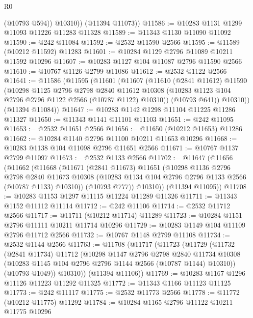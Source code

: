 \begin{lexlean}{R0}
\begin{coremodule}
            (@10793 @594))
          @10310))
      (@11394 @11073))
@11586 := @10283 @1131 @1299 @11093 @11226 @11283 @11328
@11589 := @11343 @1130 @11090 @11092
@11590 := @242 @11084
@11592 := @2532 @11590 @2566
@11595 := @11589 (@10212 @11592) @11283
@11601 := @10284 @1129 @2796 @11089 @10211 @11592 @10296
@11607 := @10283 @1127 @104 @11087 @2796 @11590 @2566
@11610 := @10767 @1126 @2799 @11086
@11612 := @2532 @1122 @2566
@11641 := @11586
    (@11595
      (@11601
        (@11607
          (@11610
            (@2841 @11612)
            @11590
            (@10298
              @1125
              @2796
              @2798
              @2840
              @11612
              @10308
              (@10283 @1123 @104 @2796 @2796 @1122 @2566 (@10787 @1122) @10310))
            (@10793 @641))
          @10310))
      (@11394 @11084))
@11647 := @10283 @1142 @1298 @11104 @11225 @11286 @11327
@11650 := @11343 @1141 @11101 @11103
@11651 := @242 @11095
@11653 := @2532 @11651 @2566
@11656 := @11650 (@10212 @11653) @11286
@11662 := @10284 @1140 @2796 @11100 @10211 @11653 @10296
@11668 := @10283 @1138 @104 @11098 @2796 @11651 @2566
@11671 := @10767 @1137 @2799 @11097
@11673 := @2532 @1133 @2566
@11702 := @11647
    (@11656
      (@11662
        (@11668
          (@11671
            (@2841 @11673)
            @11651
            (@10298
              @1136
              @2796
              @2798
              @2840
              @11673
              @10308
              (@10283 @1134 @104 @2796 @2796 @1133 @2566 (@10787 @1133) @10310))
            (@10793 @777))
          @10310))
      (@11394 @11095))
@11708 := @10283 @1153 @1297 @11115 @11224 @11289 @11326
@11711 := @11343 @1152 @11112 @11114
@11712 := @242 @11106
@11714 := @2532 @11712 @2566
@11717 := @11711 (@10212 @11714) @11289
@11723 := @10284 @1151 @2796 @11111 @10211 @11714 @10296
@11729 := @10283 @1149 @104 @11109 @2796 @11712 @2566
@11732 := @10767 @1148 @2799 @11108
@11734 := @2532 @1144 @2566
@11763 := @11708
    (@11717
      (@11723
        (@11729
          (@11732
            (@2841 @11734)
            @11712
            (@10298
              @1147
              @2796
              @2798
              @2840
              @11734
              @10308
              (@10283 @1145 @104 @2796 @2796 @1144 @2566 (@10787 @1144) @10310))
            (@10793 @1049))
          @10310))
      (@11394 @11106))
@11769 := @10283 @1167 @1296 @11126 @11223 @11292 @11325
@11772 := @11343 @1166 @11123 @11125
@11773 := @242 @11117
@11775 := @2532 @11773 @2566
@11778 := @11772 (@10212 @11775) @11292
@11784 := @10284 @1165 @2796 @11122 @10211 @11775 @10296

\end{coremodule}
\end{lexlean}
